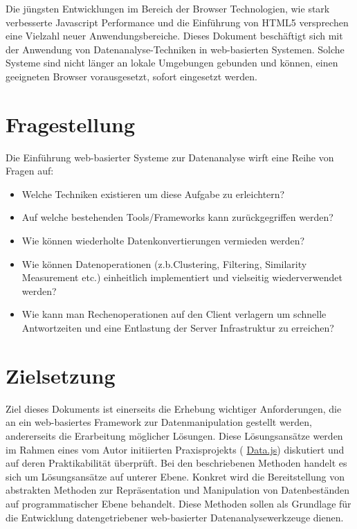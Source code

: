 \documentclass[runningheads]{llncs}
\begin{document}
Die jüngsten Entwicklungen im Bereich der Browser Technologien, wie stark verbesserte Javascript Performance und die Einführung von HTML5 versprechen eine Vielzahl neuer Anwendungsbereiche. Dieses Dokument beschäftigt sich mit der Anwendung von Datenanalyse-Techniken in web-basierten Systemen. Solche Systeme sind nicht länger an lokale Umgebungen gebunden und können, einen geeigneten Browser vorausgesetzt, sofort eingesetzt werden.

\section{Fragestellung}


Die Einführung web-basierter Systeme zur Datenanalyse wirft eine Reihe von Fragen auf:\begin{itemize}
\item Welche Techniken existieren um diese Aufgabe zu erleichtern? 
\item Auf welche bestehenden Tools/Frameworks kann zurückgegriffen werden?
\item Wie können wiederholte Datenkonvertierungen vermieden werden?
\item Wie können Datenoperationen (z.b.Clustering, Filtering, Similarity Measurement etc.) einheitlich implementiert und vielseitig wiederverwendet werden? 
\item Wie kann man Rechenoperationen auf den Client verlagern um schnelle Antwortzeiten und eine Entlastung der Server Infrastruktur zu erreichen?\end{itemize}


\section{Zielsetzung}


Ziel dieses Dokuments ist einerseits die Erhebung wichtiger Anforderungen, die an ein web-basiertes Framework zur Datenmanipulation gestellt werden, andererseits die Erarbeitung möglicher Lösungen. Diese Lösungsansätze werden im Rahmen eines vom Autor initiierten Praxisprojekts ( \href{http://substance.io/#michael/data-js}{Data.js}) diskutiert und auf deren Praktikabilität überprüft. Bei den beschriebenen Methoden handelt es sich um Lösungsansätze auf unterer Ebene. Konkret wird die Bereitstellung von abstrakten Methoden zur Repräsentation und Manipulation von Datenbeständen auf programmatischer Ebene behandelt. Diese Methoden sollen als Grundlage für die Entwicklung datengetriebener web-basierter Datenanalysewerkzeuge dienen.
\end{document}
